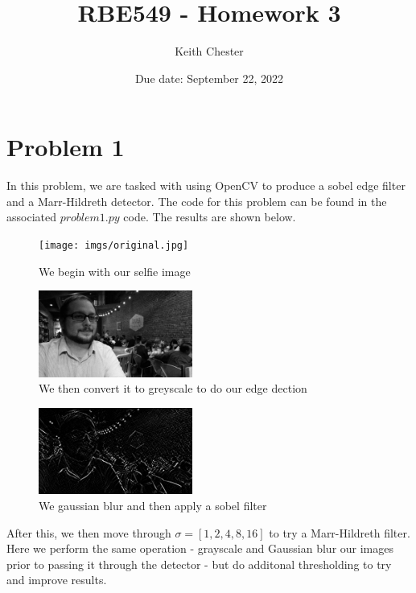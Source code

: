\documentclass{article}
\title{RBE549 - Homework 3}
\author{Keith Chester}
\date{Due date: September 22, 2022}
\begin{document}
\maketitle

\section*{Problem 1}

In this problem, we are tasked with using OpenCV to produce a sobel edge filter and a Marr-Hildreth detector. The code for this problem can be found in the associated $problem1.py$ code. The results are shown below.

\begin{figure}[H]
    \centering
    \texttt{[image: imgs/original.jpg]}
    \caption{We begin with our selfie image}
    \label{fig:original_image}
\end{figure}

\begin{figure}[H]
    \centering
    \includegraphics[width = 0.45\textwidth]{imgs/gray.jpg}
    \caption{We then convert it to greyscale to do our edge dection}
    \label{fig:grayscale}
\end{figure}

\begin{figure}[H]
    \centering
    \includegraphics[width = 0.45\textwidth]{imgs/sobel.jpg}
    \caption{We gaussian blur and then apply a sobel filter}
    \label{fig:sobel}
\end{figure}

\noindent

After this, we then move through $\sigma=[1, 2, 4, 8, 16]$ to try a Marr-Hildreth filter. Here we perform the same operation - grayscale and Gaussian blur our images prior to passing it through the detector - but do additonal thresholding to try and improve results.
\end{document}
